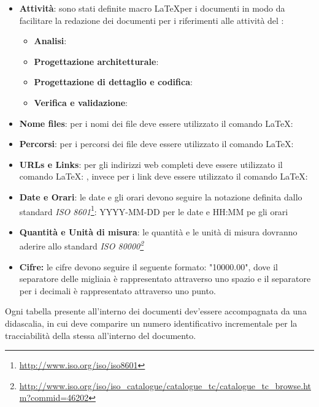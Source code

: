 \documentclass[12pt,a4paper]{article}
\begin{document}
\begin{itemize}
\begin{itemize}
	\end{itemize}
	\item \textbf{Attività}: sono stati definite macro  \LaTeX per i documenti in modo da facilitare la redazione dei documenti per i riferimenti alle attività del \PdP:
	\begin{itemize}
		\item \textbf{Analisi}: 
		\item \textbf{Progettazione architetturale}: 
		\item \textbf{Progettazione di dettaglio e codifica}: 
		\item \textbf{Verifica e validazione}: 
	\end{itemize}
\end{itemize}

\label{formati}
\begin{itemize}
	\item \textbf{Nome files}: per i nomi dei file deve essere utilizzato il comando \LaTeX: 
	\item  \textbf{Percorsi}: per i percorsi dei file deve essere utilizzato il comando \LaTeX: 
	\item \textbf{URLs e Links}:  per gli indirizzi web completi deve essere utilizzato il comando \LaTeX: , invece per i link deve essere utilizzato il comando \LaTeX: 
	\item \textbf{Date e Orari}: le date e gli orari devono seguire la notazione definita dallo standard \emph{ISO 8601}\footnote{\url{http://www.iso.org/iso/iso8601}}: YYYY-MM-DD per le date e HH:MM pe gli orari
	\item \textbf{Quantità e Unità di misura}: le quantità e le unità di misura dovranno aderire allo standard \emph{ISO 80000\footnote{\url{http://www.iso.org/iso/iso_catalogue/catalogue_tc/catalogue_tc_browse.htm?commid=46202}}}
	\item \textbf{Cifre:} le cifre devono seguire il seguente formato: "\num{10000.00}", dove il separatore delle migliaia è rappresentato attraverso uno spazio e il separatore per i decimali è rappresentato attraverso uno punto.
\end{itemize}

Ogni tabella presente all'interno dei documenti dev'essere accompagnata da una didascalia, in cui deve comparire un numero identificativo incrementale per la tracciabilità della stessa all'interno del documento.
\end{document}
